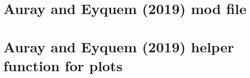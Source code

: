 \documentclass[a4paper]{scrartcl}
\begin{document}
\newpage

\appendix

\section{Auray and Eyquem (2019) mod file\label{app:AurayEyquem2019.modfile}}


\section{Auray and Eyquem (2019) helper function for plots\label{app:AurayEyquem2019.plotfile}}

\end{document}
